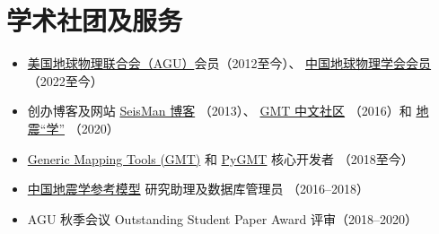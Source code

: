 \section{学术社团及服务}

\begin{itemize}
      \item \href{https://sites.agu.org/}{美国地球物理联合会（AGU）}会员（2012至今）、
            \href{http://www.cgscgs.org.cn/}{中国地球物理学会会员}（2022至今）
      \item 创办博客及网站
            \href{https://blog.seisman.info}{SeisMan 博客} （2013）、
            \href{http://gmt-china.org/}{GMT 中文社区} （2016）和
            \href{https://seismo-learn.org/}{地震``学''} （2020）
      \item \href{https://github.com/GenericMappingTools/gmt}{Generic Mapping Tools (GMT)} 和
            \href{https://github.com/GenericMappingTools/pygmt}{PyGMT} 核心开发者 （2018至今）
      \item \href{http://chinageorefmodel.org/}{中国地震学参考模型} 研究助理及数据库管理员 （2016--2018）
      \item AGU 秋季会议 Outstanding Student Paper Award 评审（2018--2020）
\end{itemize}
